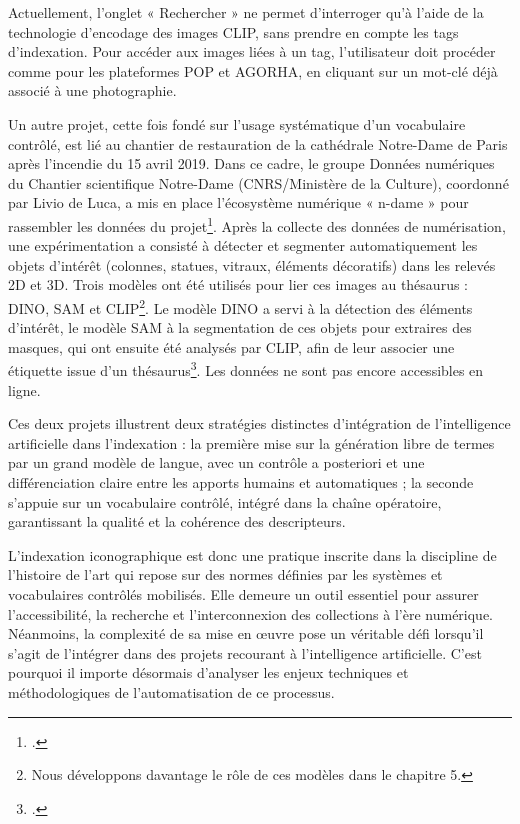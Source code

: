Actuellement, l’onglet « Rechercher » ne permet d’interroger qu’à l’aide de la technologie d’encodage des images CLIP, sans prendre en compte les tags d’indexation. Pour accéder aux images liées à un tag, l’utilisateur doit procéder comme pour les plateformes POP et AGORHA, en cliquant sur un mot-clé déjà associé à une photographie.

Un autre projet, cette fois fondé sur l’usage systématique d’un vocabulaire contrôlé, est lié au chantier de restauration de la cathédrale Notre-Dame de Paris après l’incendie du 15 avril 2019. Dans ce cadre, le groupe Données numériques du Chantier scientifique Notre-Dame (CNRS/Ministère de la Culture), coordonné par Livio de Luca, a mis en place l’écosystème numérique « n-dame » pour rassembler les données du projet\footcites{delucaLecosystemeNumeriqueNdame2022}{delucaDigitalEcosystemMultidisciplinary2024}. Après la collecte des données de numérisation, une expérimentation a consisté à détecter et segmenter automatiquement les objets d’intérêt (colonnes, statues, vitraux, éléments décoratifs) dans les relevés 2D et 3D. Trois modèles ont été utilisés pour lier ces images au thésaurus : DINO, SAM et CLIP\footnote{Nous développons davantage le rôle de ces modèles dans le chapitre 5.}. Le modèle DINO a servi à la détection des éléments d’intérêt, le modèle SAM à la segmentation de ces objets pour extraires des masques, qui ont ensuite été analysés par CLIP, afin de leur associer une étiquette issue d’un thésaurus\footcite[p. 10]{delucaIntelligenceHumaineCollective2024}. Les données ne sont pas encore accessibles en ligne.

Ces deux projets illustrent deux stratégies distinctes d’intégration de l’intelligence artificielle dans l’indexation : la première mise sur la génération libre de termes par un grand modèle de langue, avec un contrôle a posteriori et une différenciation claire entre les apports humains et automatiques ; la seconde s’appuie sur un vocabulaire contrôlé, intégré dans la chaîne opératoire, garantissant la qualité et la cohérence des descripteurs.

L’indexation iconographique est donc une pratique inscrite dans la discipline de l’histoire de l’art qui repose sur des normes définies par les systèmes et vocabulaires contrôlés mobilisés. Elle demeure un outil essentiel pour assurer l’accessibilité, la recherche et l’interconnexion des collections à l’ère numérique. Néanmoins, la complexité de sa mise en œuvre pose un véritable défi lorsqu’il s’agit de l’intégrer dans des projets recourant à l’intelligence artificielle. C’est pourquoi il importe désormais d’analyser les enjeux techniques et méthodologiques de l’automatisation de ce processus.
